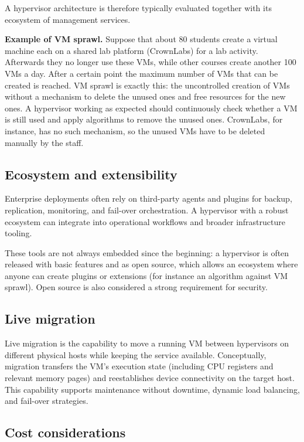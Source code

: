 A hypervisor architecture is therefore typically evaluated together with its ecosystem of management services.

\textbf{Example of VM sprawl.} Suppose that about 80 students create a virtual machine each on a shared lab platform (CrownLabs) for a lab activity. Afterwards they no longer use these VMs, while other courses create another 100 VMs a day. After a certain point the maximum number of VMs that can be created is reached. VM sprawl is exactly this: the uncontrolled creation of VMs without a mechanism to delete the unused ones and free resources for the new ones. A hypervisor working as expected should continuously check whether a VM is still used and apply algorithms to remove the unused ones. CrownLabs, for instance, has no such mechanism, so the unused VMs have to be deleted manually by the staff.

\subsection{Ecosystem and extensibility}

Enterprise deployments often rely on third-party agents and plugins for backup, replication, monitoring, and fail-over orchestration. A hypervisor with a robust ecosystem can integrate into operational workflows and broader infrastructure tooling.

These tools are not always embedded since the beginning: a hypervisor is often released with basic features and as open source, which allows an ecosystem where anyone can create plugins or extensions (for instance an algorithm against VM sprawl). Open source is also considered a strong requirement for security.

\subsection{Live migration}

Live migration is the capability to move a running VM between hypervisors on different physical hosts while keeping the service available. Conceptually, migration transfers the VM's execution state (including CPU registers and relevant memory pages) and reestablishes device connectivity on the target host. This capability supports maintenance without downtime, dynamic load balancing, and fail-over strategies.

\subsection{Cost considerations}

